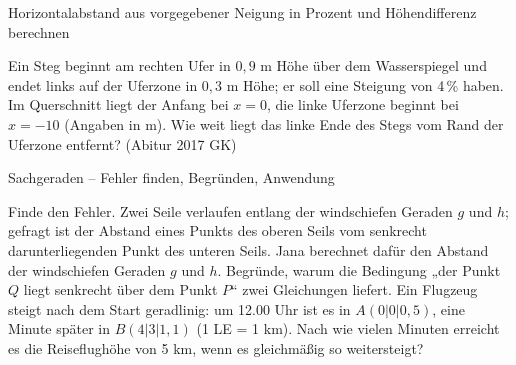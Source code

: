 \begin{aufgabe}{Horizontalabstand aus vorgegebener Neigung in Prozent und Höhendifferenz berechnen}
\begin{teile}
\teil Ein Steg beginnt am rechten Ufer in $0{,}9$ m Höhe über dem Wasserspiegel und endet links auf der Uferzone in $0{,}3$ m Höhe; er soll eine Steigung von 4\,\% haben. Im Querschnitt liegt der Anfang bei $x = 0$, die linke Uferzone beginnt bei $x = -10$ (Angaben in m). Wie weit liegt das linke Ende des Stegs vom Rand der Uferzone entfernt? \hfill (Abitur 2017 GK) \\ \leerfeld[m]
\end{teile}
\end{aufgabe}

\begin{aufgabe}{Sachgeraden – Fehler finden, Begründen, Anwendung}
\begin{teile}
\teil Finde den Fehler. Zwei Seile verlaufen entlang der windschiefen Geraden $g$ und $h$; gefragt ist der Abstand eines Punkts des oberen Seils vom senkrecht darunterliegenden Punkt des unteren Seils. Jana berechnet dafür den Abstand der windschiefen Geraden $g$ und $h$.
\teil Begründe, warum die Bedingung „der Punkt $Q$ liegt senkrecht über dem Punkt $P$“ zwei Gleichungen liefert.
\teil Ein Flugzeug steigt nach dem Start geradlinig: um 12.00 Uhr ist es in $A(0 | 0 | 0{,}5)$, eine Minute später in $B(4 | 3 | 1{,}1)$ (1 LE = 1 km). Nach wie vielen Minuten erreicht es die Reiseflughöhe von 5 km, wenn es gleichmäßig so weitersteigt? \leerfeld[min]
\end{teile}
\end{aufgabe}
